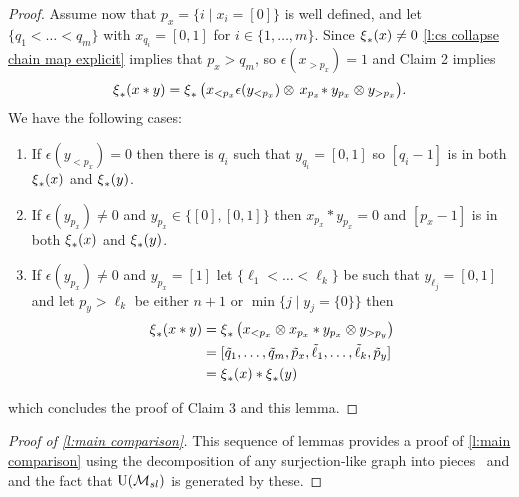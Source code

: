 \begin{proof}
	Assume now that $p_x = \big\{ i \mid x_i = [0] \big\}$ is well defined, and let $\{q_1 < \dots < q_m\}$ with $x_{q_i} = [0,1]$ for $i \in \{1,\dots,m\}$.
	Since $\operatorname{\xi}_\ast(x) \neq 0$ \cref{l:cs collapse chain map explicit} implies that $p_x > q_m$, so $\epsilon(x_{>p_x}) = 1$ and Claim 2 implies
	\[
	\operatorname{\xi}_\ast(x \ast y) =
	\operatorname{\xi}_\ast \big( x_{<p_x} \epsilon(y_{<p_x}) \otimes \, x_{p_x} \! \ast y_{p_x} \otimes y_{>p_x} \big).
	\]
	We have the following cases:
	\begin{enumerate}
		\item If $\epsilon(y_{<p_x}) = 0$ then there is $q_i$ such that $y_{q_i} = [0,1]$ so $[q_i-1]$ is in both $\operatorname{\xi}_\ast(x)$ and $\operatorname{\xi}_\ast(y)$.
		\item If $\epsilon(y_{p_x}) \neq 0$ and $y_{p_x} \in \{[0], [0,1]\}$ then $x_{p_x} \ast y_{p_x} = 0$ and $[p_x-1]$ is in both $\operatorname{\xi}_\ast(x)$ and $\operatorname{\xi}_\ast(y)$.
		\item If $\epsilon(y_{p_x}) \neq 0$ and $y_{p_x} = [1]$ let $\{\ell_1 < \dots < \ell_k\}$ be such that $y_{\ell_j} = [0,1]$ and let $p_y > \ell_k$ be either $n+1$ or $\min\{j \mid y_j = \{0\}\}$ then
		\begin{align*}
		\operatorname{\xi}_\ast(x \ast y) & =
		\operatorname{\xi}_\ast \big( x_{< p_x} \otimes x_{p_x} \ast y_{p_x} \otimes y_{> p_y} \big) \\ & =
		[\tilde q_1, \dots, \tilde q_m, \tilde p_x, \tilde \ell_1, \dots, \tilde \ell_k, \tilde p_y] \\ & =
		\operatorname{\xi}_\ast(x) \ast \operatorname{\xi}_\ast(y)
		\end{align*}
	\end{enumerate}
	which concludes the proof of Claim 3 and this lemma.
\end{proof}

\begin{proof}[Proof of \cref{l:main comparison}]
	This sequence of lemmas provides a proof of \cref{l:main comparison} using the decomposition of any surjection-like graph into pieces \coproduct \ and \product and the fact that ${\operatorname{U}(\mathcal{M}_{sl})}$ is generated by these.
\end{proof}